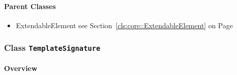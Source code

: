 \paragraph{Parent Classes}
\begin{itemize}
\item ExtendableElement see Section~\ref{cls:core::ExtendableElement} on Page~\pageref{cls:core::ExtendableElement}\end{itemize}
\subsubsection{\Large{Class \bfseries \texttt{TemplateSignature}\normalfont}}
\label{cls:storydiagrams::templates::TemplateSignature} 
\paragraph{Overview}

	
